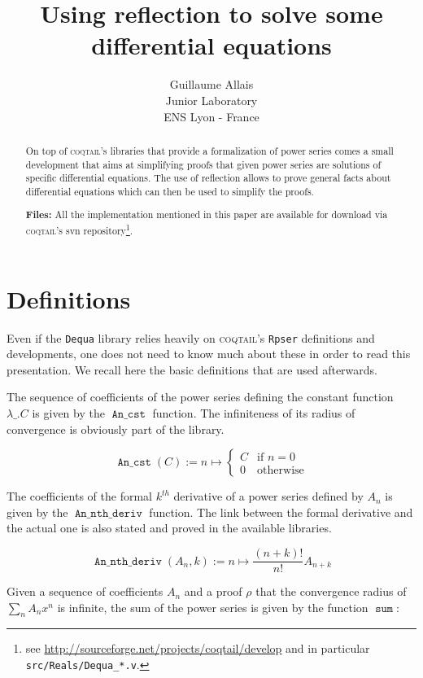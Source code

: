 \documentclass{article}
\title{Using reflection to solve some differential equations}
\author{Guillaume Allais\\
Junior Laboratory \coqtail{}\\
ENS Lyon - France}
\newcommand{\coqtail}{\textsc{coqtail}}
\newcommand{\dequa}{\texttt{Dequa}}
\newcommand{\Rpser}{\texttt{Rpser}}
\DeclareMathOperator{\Psum}{\mathtt{sum}}
\DeclareMathOperator{\C}{\mathtt{An\_cst}}
\DeclareMathOperator{\Dn}{\mathtt{An\_nth\_deriv}}
\begin{document}
\maketitle{}

\begin{abstract}
On top of \coqtail{}'s libraries that provide a formalization of power series
comes a small development that aims at simplifying proofs that given power
series are solutions of specific differential equations. The use of reflection
allows to prove general facts about differential equations which can then be
used to simplify the proofs.

\textbf{Files:} All the implementation mentioned in this paper are
available for download via \coqtail{}'s svn repository\footnote{see
\url{http://sourceforge.net/projects/coqtail/develop}
and in particular \texttt{src/Reals/Dequa\_*.v}.}.
\end{abstract}

\section{Definitions}

Even if the \dequa{} library relies heavily on \coqtail{}'s \Rpser{}
definitions and developments, one does not need to know much about these in
order to read this presentation. We recall here the basic definitions that
are used afterwards.

The sequence of coefficients of the power series defining the constant function
$\lambda\_. C$ is given by the $\C{}$ function. The infiniteness of its radius
of convergence is obviously part of the library.

$$\C{}(C) := n \mapsto \left\lbrace
\begin{array}{ll}
C & \text{if } n = 0\\
0 & \text{otherwise}
\end{array}
\right.$$

The coefficients of the formal $k^{th}$ derivative of a power series defined by
$A_n$ is given by the $\Dn{}$ function. The link between the formal derivative
and the actual one is also stated and proved in the available libraries.

$$\Dn{}(A_n, k) := n \mapsto \frac{(n + k)!}{n!}A_{n+k}$$

Given a sequence of coefficients $A_n$ and a proof $\rho$ that the convergence
radius of $\sum_n A_n x^n$ is infinite, the sum of the power series is given by
the function $\Psum{}$:
\end{document}
